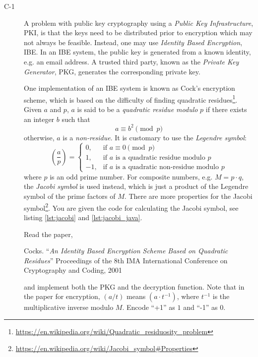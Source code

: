 \documentclass{article}
\begin{document}
		\begin{description}
			\item[C-1]{A problem with public key cryptography using a \emph{Public Key Infrastructure}, PKI, is that
				the keys need to be distributed prior to encryption which may not always be feasible.
				Instead, one may use \emph{Identity Based Encryption}, IBE. In an IBE system, the public key is generated
				from a known identity, e.g. an email address. A trusted third party, known as the \emph{Private Key Generator}, PKG,
				generates the corresponding private key.
				
				One implementation of an IBE system is known as Cock's encryption scheme,
				which is based on the difficulty of finding quadratic 
				residues\footnote{\url{https://en.wikipedia.org/wiki/Quadratic_residuosity_problem}}.
				Given $a$ and $p$, $a$ is said to be a \emph{quadratic residue modulo} $p$ if there exists an integer $b$
				such that
				\[
				a \equiv b^2 \pmod p
				\]
				otherwise, $a$ is a \emph{non-residue}.
				It is customary to use the \emph{Legendre symbol}:
				\[
				\left(\frac{a}{p}\right) = 
				\begin{cases}
				0, & \text{if $a \equiv 0 \pmod p$}\\
				1, & \text{if $a$ is a quadratic residue modulo $p$}\\
				-1, & \text{if $a$ is a quadratic non-residue modulo $p$}
				\end{cases}
				\]
				where $p$ is an odd prime number. For composite numbers, e.g. $M = p \cdot q$, the \emph{Jacobi symbol} is used
				instead, which is just a product of the Legendre symbol of the prime factors of $M$.
				There are more properties for the Jacobi symbol\footnote{\url{https://en.wikipedia.org/wiki/Jacobi_symbol#Properties}}. You are given the code
				for calculating the Jacobi symbol, see listing \ref{lst:jacobi} and \ref{lst:jacobi_java}. 
				
				Read the paper,
				\begin{center}
					\begin{minipage}{0.8\textwidth}
						Cocks. ``\emph{An Identity Based Encryption Scheme Based on Quadratic Residues}'' 
						Proceedings of the 8th IMA International Conference on Cryptography and Coding, 2001
					\end{minipage}
				\end{center}
				and implement both the PKG and the decryption function. Note that in the paper for encryption, 
				$(a / t)$ means $(a \cdot t^{-1})$, where $t^{-1}$ is the multiplicative inverse modulo $M$.
				Encode ``+1'' as $1$ and ``-1'' as $0$.
				
}
\end{description}
\end{document}
